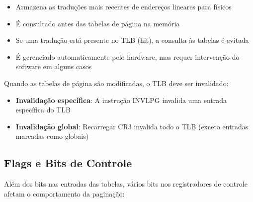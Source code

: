 \begin{itemize}
    \item Armazena as traduções mais recentes de endereços lineares para físicos
    \item É consultado antes das tabelas de página na memória
    \item Se uma tradução está presente no TLB (hit), a consulta às tabelas é evitada
    \item É gerenciado automaticamente pelo hardware, mas requer intervenção do software em alguns casos
\end{itemize}

Quando as tabelas de página são modificadas, o TLB deve ser invalidado:
\begin{itemize}
    \item \textbf{Invalidação específica}: A instrução INVLPG invalida uma entrada específica do TLB
    \item \textbf{Invalidação global}: Recarregar CR3 invalida todo o TLB (exceto entradas marcadas como globais)
\end{itemize}

\subsection{Flags e Bits de Controle}
\label{subsec:flags_controle}

Além dos bits nas entradas das tabelas, vários bits nos registradores de controle afetam o comportamento da paginação:

